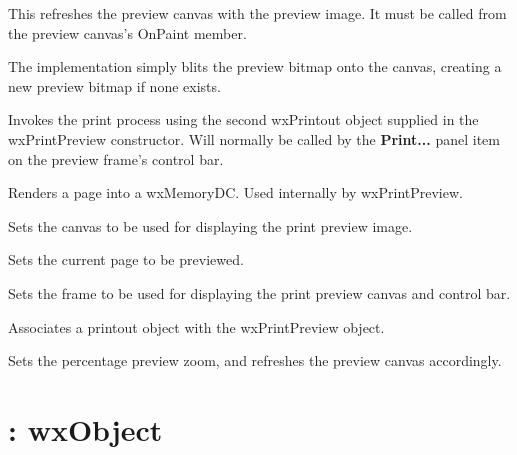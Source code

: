 This refreshes the preview canvas with the preview image.
It must be called from the preview canvas's OnPaint member.

The implementation simply blits the preview bitmap onto
the canvas, creating a new preview bitmap if none exists.



Invokes the print process using the second wxPrintout object
supplied in the wxPrintPreview constructor.
Will normally be called by the {\bf Print...} panel item on the
preview frame's control bar.



Renders a page into a wxMemoryDC. Used internally by wxPrintPreview.



Sets the canvas to be used for displaying the print preview image.



Sets the current page to be previewed.



Sets the frame to be used for displaying the print preview canvas
and control bar.



Associates a printout object with the wxPrintPreview object.



Sets the percentage preview zoom, and refreshes the preview canvas
accordingly.



\section{: wxObject}\label{wxquerycol}

